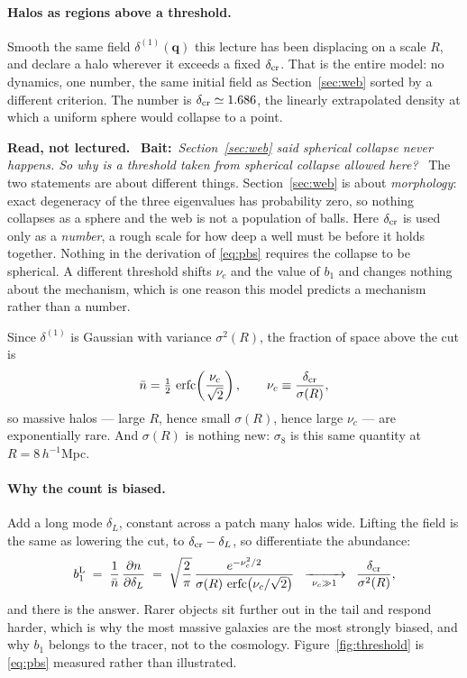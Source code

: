 \documentclass[a4paper,11pt]{article}
\newcommand{\vq}{\bm{q}}
\def\erfc{\mathop{\rm erfc}\nolimits}
\numberwithin{equation}{section}
\newenvironment{reading}
  {\par\medskip\noindent\begingroup\small\color{black!58}%
   \textbf{Read, not lectured.}\ }
  {\endgroup\par\medskip}
\newcommand{\bait}[1]{\textbf{Bait:}\ \emph{#1}\ }
\newcounter{derivation}
\begin{document}
\paragraph{Halos as regions above a threshold.} Smooth the same field
$\delta^{(1)}(\vq)$ this lecture has been displacing on a scale $R$, and declare
a halo wherever it exceeds a fixed $\delta_{\rm cr}$. That is the entire model:
no dynamics, one number, the same initial field as Section~\ref{sec:web} sorted
by a different criterion. The number is $\delta_{\rm cr} \simeq 1.686$, the
linearly extrapolated density at which a uniform sphere would collapse to a
point.

\begin{reading}
\bait{Section~\ref{sec:web} said spherical collapse never happens. So why is a
threshold taken from spherical collapse allowed here?}
The two statements are about different things.
Section~\ref{sec:web} is about \emph{morphology}: exact degeneracy of the three
eigenvalues has probability zero, so nothing collapses as a sphere and the web
is not a population of balls. Here $\delta_{\rm cr}$ is used only as a
\emph{number}, a rough scale for how deep a well must be before it holds
together. Nothing in the derivation of \eqref{eq:pbs} requires the collapse to
be spherical. A different threshold shifts $\nu_c$ and the value of $b_1$ and
changes nothing about the mechanism, which is one reason this model predicts a
mechanism rather than a number.
\end{reading} Since $\delta^{(1)}$ is Gaussian with variance
$\sigma^2(R)$, the fraction of space above the cut is
\begin{equation}
\bar n = \tfrac12\,\erfc\!\left(\frac{\nu_c}{\sqrt2}\right) ,
\qquad
\nu_c \equiv \frac{\delta_{\rm cr}}{\sigma(R)} ,
\label{eq:halo_abundance}
\end{equation}
so massive halos --- large $R$, hence small $\sigma(R)$, hence large $\nu_c$ ---
are exponentially rare. And $\sigma(R)$ is nothing new: $\sigma_8$ is this same
quantity at $R = 8\,h^{-1}$Mpc.

\paragraph{Why the count is biased.} Add a long mode $\delta_L$, constant across
a patch many halos wide. Lifting the field is the same as lowering the cut, to
$\delta_{\rm cr} - \delta_L$, so differentiate the abundance:
\begin{equation}
b_1^{\rm L} \;=\; \frac{1}{\bar n}\,\frac{\partial n}{\partial\delta_L}
\;=\; \sqrt{\frac{2}{\pi}}\,
\frac{e^{-\nu_c^2/2}}{\sigma(R)\,\erfc\!\left(\nu_c/\sqrt2\right)}
\;\;\xrightarrow[\ \nu_c \gg 1\ ]{}\;\;
\frac{\delta_{\rm cr}}{\sigma^2(R)} ,
\label{eq:pbs}
\end{equation}
and there is the answer. Rarer objects sit further out in the tail and respond
harder, which is why the most massive galaxies are the most strongly biased, and why $b_1$ belongs to the tracer, not to the cosmology.
Figure~\ref{fig:threshold} is \eqref{eq:pbs} measured rather than illustrated.
\end{document}
